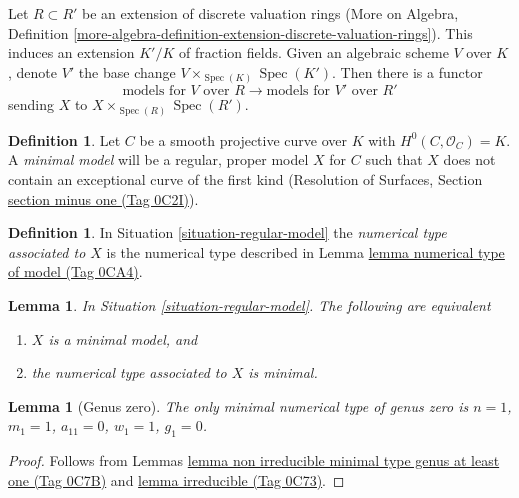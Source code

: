 \documentclass{amsart}
\theoremstyle{plain}
\newtheorem{lemma}[subsection]{Lemma}
\theoremstyle{definition}
\newtheorem{definition}[subsection]{Definition}
\theoremstyle{remark}
\numberwithin{equation}{subsection}
\def\Spec{\mathop{\mathrm{Spec}}}
\begin{document}
\medskip\noindent
Let $R \subset R'$ be an extension of discrete valuation rings
(More on Algebra, Definition
\ref{more-algebra-definition-extension-discrete-valuation-rings}).
This induces an extension $K'/K$ of fraction fields.
Given an algebraic scheme $V$ over $K$, denote $V'$ the
base change $V \times_{\Spec(K)} \Spec(K')$. Then there is
a functor
$$
\text{models for }V\text{ over }R
\longrightarrow
\text{models for }V'\text{ over }R'
$$
sending $X$ to $X \times_{\Spec(R)} \Spec(R')$.



\begin{definition}
\label{definition-minimal-model}
Let $C$ be a smooth projective curve over $K$ with
$H^0(C, \mathcal{O}_C) = K$. A {\it minimal model}
will be a regular, proper model $X$ for $C$ such that
$X$ does not contain an exceptional curve of the first kind
(Resolution of Surfaces, Section \href{https://stacks.math.columbia.edu/tag/0C2I}{section minus one (Tag 0C2I)}).
\end{definition}

\begin{definition}
\label{definition-numerical-type-model}
In Situation \ref{situation-regular-model} the
{\it numerical type associated to $X$} is the numerical
type described in Lemma \href{https://stacks.math.columbia.edu/tag/0CA4}{lemma numerical type of model (Tag 0CA4)}.
\end{definition}

\begin{lemma}
\label{lemma-numerical-type-minimal-model}
In Situation \ref{situation-regular-model}. The following
are equivalent
\begin{enumerate}
\item $X$ is a minimal model, and
\item the numerical type associated to $X$ is minimal.
\end{enumerate}
\end{lemma}

\begin{lemma}[Genus zero]
\label{lemma-genus-zero}
The only minimal numerical type of genus zero is
$n = 1$, $m_1 = 1$, $a_{11} = 0$, $w_1 = 1$, $g_1 = 0$.
\end{lemma}

\begin{proof}
Follows from Lemmas \href{https://stacks.math.columbia.edu/tag/0C7B}{lemma non irreducible minimal type genus at least one (Tag 0C7B)}
and \href{https://stacks.math.columbia.edu/tag/0C73}{lemma irreducible (Tag 0C73)}.
\end{proof}
\end{document}
